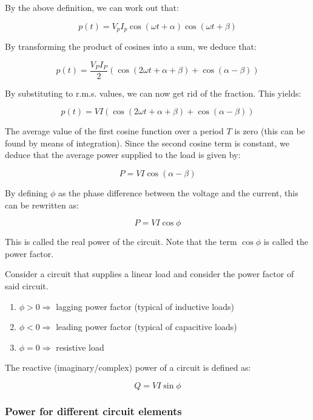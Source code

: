 \documentclass{article}
\begin{document}
By the above definition, we can work out that:

\[ p(t) = V_pI_p\cos{(\omega t + \alpha)}\cos{(\omega t + \beta)} \]

By transforming the product of cosines into a sum, we deduce that:

\[ p(t) = \frac{V_PI_P}{2}(\cos{(2\omega t + \alpha + \beta)} + \cos{(\alpha - \beta)}) \]

By substituting to r.m.s. values, we can now get rid of the fraction. This yields:

\[ p(t) = VI(\cos{(2\omega t + \alpha + \beta)} + \cos{(\alpha - \beta)}) \]

The average value of the first cosine function over a period $T$ is zero (this can be found by means of integration). Since the second cosine term is constant, we deduce that the average power supplied to the load is given by:

\[ P = VI\cos{(\alpha - \beta)} \]

By defining $\phi$ as the phase difference between the voltage and the current, this can be rewritten as:

\[ P = VI\cos{\phi} \]

This is called the real power of the circuit. Note that the term $\cos{\phi}$ is called the power factor.

\begin{proposition}
    Consider a circuit that supplies a linear load and consider the power factor of said circuit.

    \begin{enumerate}
        \item $\phi > 0 \Rightarrow $ lagging power factor (typical of inductive loads)
        \item $\phi < 0 \Rightarrow $ leading power factor (typical of capacitive loads)
        \item $\phi = 0 \Rightarrow $ resistive load
    \end{enumerate}
\end{proposition}

\begin{definition}
    The reactive (imaginary/complex) power of a circuit is defined as:

    \[ Q = VI\sin{\phi} \]
\end{definition}

\subsubsection{Power for different circuit elements}
\end{document}
